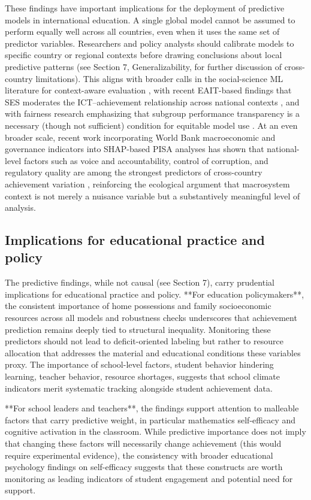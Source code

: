 \documentclass[pdflatex,sn-mathphys-ay]{sn-jnl}
\begin{document}
These findings have important implications for the deployment of predictive models in international education. A single global model cannot be assumed to perform equally well across all countries, even when it uses the same set of predictor variables. Researchers and policy analysts should calibrate models to specific country or regional contexts before drawing conclusions about local predictive patterns (see Section 7, Generalizability, for further discussion of cross-country limitations). This aligns with broader calls in the social-science ML literature for context-aware evaluation \citep{Sahoo_2024}, with recent EAIT-based findings that SES moderates the ICT–achievement relationship across national contexts \citep{KC_2025_digital_inequality}, and with fairness research emphasizing that subgroup performance transparency is a necessary (though not sufficient) condition for equitable model use \citep{Li_2025,Kizilcec_Lee_2022}. At an even broader scale, recent work incorporating World Bank macroeconomic and governance indicators into SHAP-based PISA analyses has shown that national-level factors such as voice and accountability, control of corruption, and regulatory quality are among the strongest predictors of cross-country achievement variation \citep{Kisman_2026}, reinforcing the ecological argument that macrosystem context is not merely a nuisance variable but a substantively meaningful level of analysis.

\subsection{Implications for educational practice and policy}

The predictive findings, while not causal (see Section 7), carry prudential implications for educational practice and policy. **For education policymakers**, the consistent importance of home possessions and family socioeconomic resources across all models and robustness checks underscores that achievement prediction remains deeply tied to structural inequality. Monitoring these predictors should not lead to deficit-oriented labeling but rather to resource allocation that addresses the material and educational conditions these variables proxy. The importance of school-level factors, student behavior hindering learning, teacher behavior, resource shortages, suggests that school climate indicators merit systematic tracking alongside student achievement data.

**For school leaders and teachers**, the findings support attention to malleable factors that carry predictive weight, in particular mathematics self-efficacy and cognitive activation in the classroom. While predictive importance does not imply that changing these factors will necessarily change achievement (this would require experimental evidence), the consistency with broader educational psychology findings on self-efficacy \citep{Bandura_1997_self_efficacy} suggests that these constructs are worth monitoring as leading indicators of student engagement and potential need for support.
\end{document}
